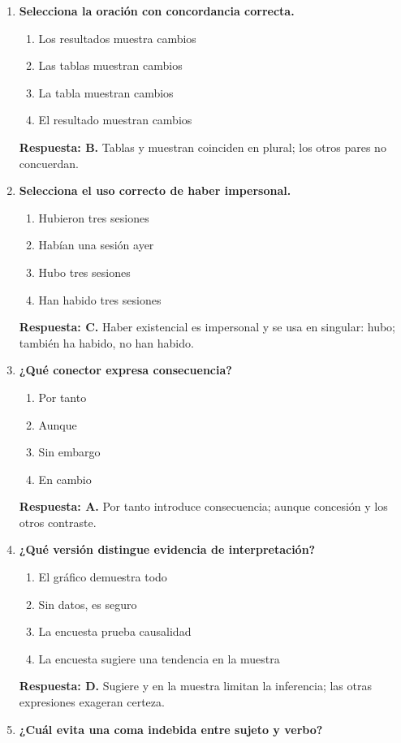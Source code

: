 \begin{enumerate}
\item\textbf{Selecciona la oración con concordancia correcta.}
\begin{enumerate}[label=\Alph*)]
\item Los resultados muestra cambios
\item Las tablas muestran cambios
\item La tabla muestran cambios
\item El resultado muestran cambios
\end{enumerate}
\textbf{Respuesta: B.} Tablas y muestran coinciden en plural; los otros pares no concuerdan.
\item\textbf{Selecciona el uso correcto de haber impersonal.}
\begin{enumerate}[label=\Alph*)]
\item Hubieron tres sesiones
\item Habían una sesión ayer
\item Hubo tres sesiones
\item Han habido tres sesiones
\end{enumerate}
\textbf{Respuesta: C.} Haber existencial es impersonal y se usa en singular: hubo; también ha habido, no han habido.
\item\textbf{¿Qué conector expresa consecuencia?}
\begin{enumerate}[label=\Alph*)]
\item Por tanto
\item Aunque
\item Sin embargo
\item En cambio
\end{enumerate}
\textbf{Respuesta: A.} Por tanto introduce consecuencia; aunque concesión y los otros contraste.
\item\textbf{¿Qué versión distingue evidencia de interpretación?}
\begin{enumerate}[label=\Alph*)]
\item El gráfico demuestra todo
\item Sin datos, es seguro
\item La encuesta prueba causalidad
\item La encuesta sugiere una tendencia en la muestra
\end{enumerate}
\textbf{Respuesta: D.} Sugiere y en la muestra limitan la inferencia; las otras expresiones exageran certeza.
\item\textbf{¿Cuál evita una coma indebida entre sujeto y verbo?}

\end{enumerate}
